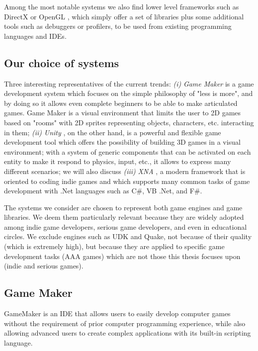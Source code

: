 Among the most notable systems we also find lower level frameworks such as DirectX \cite{CHAPTER_2_DIRECT3D_10} or OpenGL \cite{CHAPTER_2_OPENGL}, which simply offer a set of libraries plus some additional tools such as debuggers or profilers, to be used from existing programming languages and IDEs.


\subsection{Our choice of systems}
Three interesting representatives of the current trends: \textit{(i)} \textit{Game Maker} \cite{CHAPTER_2_GAME_MAKER} is a game development system which focuses on the simple philosophy of "less is more", and by doing so it allows even complete beginners to be able to make articulated games. Game Maker is a visual environment that limits the user to 2D games based on "rooms" with 2D sprites representing objects, characters, etc. interacting in them; \textit{(ii)} \textit{Unity} \cite{CHAPTER_2_UNITY}, on the other hand, is a powerful and flexible game development tool which offers the possibility of building 3D games in a visual environment; with a system of generic components that can be activated on each entity to make it respond to physics, input, etc., it allows to express many different scenarios; we will also discuss \textit{(iii)} \textit{XNA} \cite{CHAPTER_2_XNA}, a modern framework that is oriented to coding indie games and which supports many common tasks of game development with .Net languages such as C\#, VB .Net, and F\#.

The systems we consider are chosen to represent both game engines and game libraries. We deem them particularly relevant because they are widely adopted among indie game developers, serious game developers, and even in educational circles. We exclude engines such as UDK and Quake, not because of their quality (which is extremely high), but because they are applied to specific game development tasks (AAA games) which are not those this thesis focuses upon (indie and serious games).


\subsection{Game Maker}
GameMaker is an IDE that allows users to easily develop computer games without the requirement of prior computer programming experience, while also allowing advanced users to create complex applications with its built-in scripting language.

